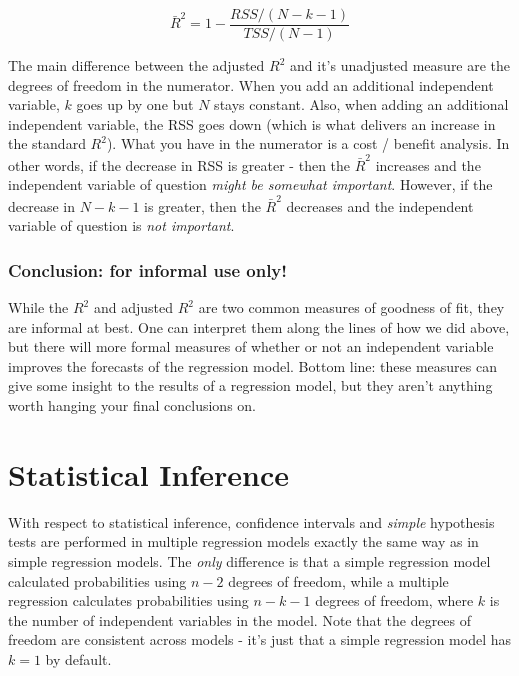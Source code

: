 \documentclass[
]{book}
\begin{document}
\[\bar{R}^2 = 1 - \frac{RSS/(N-k-1)}{TSS/(N-1)}\]

The main difference between the adjusted \(R^2\) and it's unadjusted measure are the degrees of freedom in the numerator. When you add an additional independent variable, \(k\) goes up by one but \(N\) stays constant. Also, when adding an additional independent variable, the RSS goes down (which is what delivers an increase in the standard \(R^2\)). What you have in the numerator is a cost / benefit analysis. In other words, if the decrease in RSS is greater - then the \(\bar{R}^2\) increases and the independent variable of question \emph{might be somewhat important}. However, if the decrease in \(N-k-1\) is greater, then the \(\bar{R}^2\) decreases and the independent variable of question is \emph{not important}.

\hypertarget{conclusion-for-informal-use-only}{%
\subsubsection*{Conclusion: for informal use only!}\label{conclusion-for-informal-use-only}}

While the \(R^2\) and adjusted \(R^2\) are two common measures of goodness of fit, they are informal at best. One can interpret them along the lines of how we did above, but there will more formal measures of whether or not an independent variable improves the forecasts of the regression model. Bottom line: these measures can give some insight to the results of a regression model, but they aren't anything worth hanging your final conclusions on.

\hypertarget{statistical-inference-1}{%
\section{Statistical Inference}\label{statistical-inference-1}}

With respect to statistical inference, confidence intervals and \emph{simple} hypothesis tests are performed in multiple regression models exactly the same way as in simple regression models. The \emph{only} difference is that a simple regression model calculated probabilities using \(n-2\) degrees of freedom, while a multiple regression calculates probabilities using \(n-k-1\) degrees of freedom, where \(k\) is the number of independent variables in the model. Note that the degrees of freedom are consistent across models - it's just that a simple regression model has \(k=1\) by default.
\end{document}
